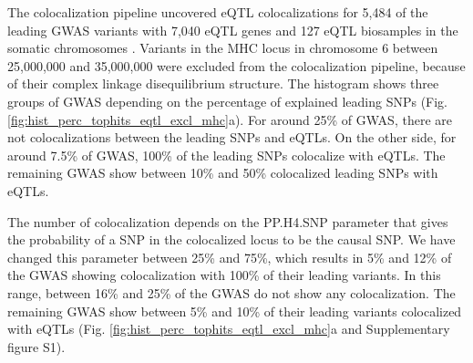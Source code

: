 The colocalization pipeline uncovered eQTL colocalizations for 5,484 of the leading GWAS variants with 7,040 eQTL genes and 127 eQTL biosamples in the somatic chromosomes \cite{2019.Posthuma.Watanabe,2021.Li.Mu}.
%
%
Variants in the MHC locus in chromosome 6 between 25,000,000 and 35,000,000 were
excluded from the colocalization pipeline, because of their complex linkage disequilibrium structure.
%
The histogram shows three groups of GWAS depending on the percentage of explained leading SNPs (Fig. \ref{fig:hist_perc_tophits_eqtl_excl_mhc}a).
%
For around 25\% of GWAS, there are not colocalizations between the leading SNPs and eQTLs.
%
On the other side, for around 7.5\% of GWAS, 100\% of the leading SNPs colocalize with eQTLs.
%
The remaining GWAS show between 10\% and 50\% colocalized leading SNPs with eQTLs.

The number of colocalization depends on the PP.H4.SNP parameter that gives the probability of a SNP in the colocalized locus to be the causal SNP.
%
We have changed this parameter between 25\% and 75\%, which results in 5\% and 12\% of the GWAS
showing colocalization with 100\% of their leading variants.
%
In this range, between 16\% and 25\% of the GWAS do not show any colocalization.
%
The remaining GWAS show between 5\% and 10\% of their leading variants colocalized with eQTLs (Fig. \ref{fig:hist_perc_tophits_eqtl_excl_mhc}a and Supplementary figure S1).

